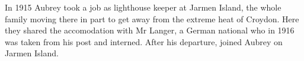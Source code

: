 


In 1915 Aubrey took a job as lighthouse keeper at Jarmen Island, the whole family moving there in part to get away from the extreme heat of Croydon.\cite{Connie1983}
Here they shared the accomodation with Mr Langer, a German national who in 1916 was taken from his post and interned.\cite{Connie1983}
After his departure,  joined Aubrey on Jarmen Island.
